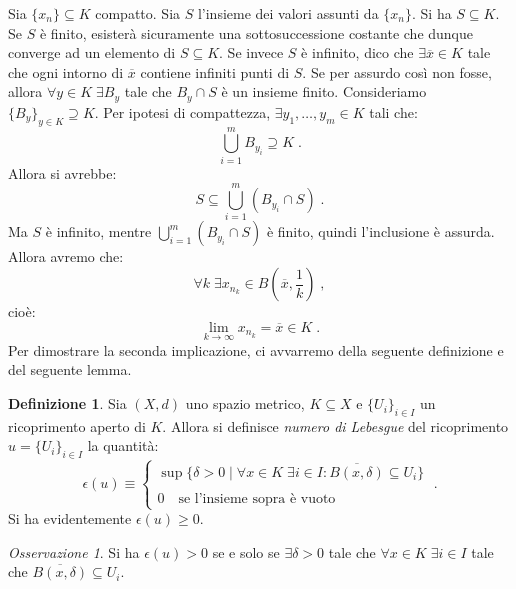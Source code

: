 \documentclass[a4paper,12pt]{report}
\theoremstyle{plain}
\theoremstyle{definition}
\newtheorem{defn}{Definizione}[section]
\theoremstyle{remark}
\newtheorem{oss}{Osservazione}[section]
\numberwithin{equation}{section}
\begin{document}
Sia $\{x_n\} \subseteq K$ compatto. Sia $S$ l'insieme dei valori assunti da $\{x_n\}$. Si ha $S \subseteq K$. Se $S$ è finito, esisterà 
sicuramente una sottosuccessione costante che dunque converge ad un elemento di $S \subseteq K$. Se invece $S$ è infinito, dico che 
$\exists \overline{x} \in K$ tale che ogni intorno di $\overline{x}$ contiene infiniti punti di $S$. Se per assurdo così non fosse, allora
 $\forall y \in K\; \exists B_y$ tale che $B_y \cap S$ è un insieme finito. Consideriamo $\{B_y\}_{y \in K} \supseteq K$. Per ipotesi di 
compattezza, $\exists y_1,\ldots,y_m \in K$ tali che:
\begin{equation}
\bigcup_{i=1}^m B_{y_i} \supseteq K\;.
\end{equation}
Allora si avrebbe:
\begin{equation}
S \subseteq \bigcup_{i=1}^m (B_{y_i} \cap S)\;.
\end{equation}
Ma $S$ è infinito, mentre $\bigcup_{i=1}^m (B_{y_i}\cap S)$ è finito, quindi l'inclusione è assurda. Allora avremo che:
\begin{equation}
\forall k\; \exists x_{n_k} \in B\left(\overline{x},\frac{1}{k}\right)\;,
\end{equation}
cioè:
\begin{equation}
\lim_{k \to \infty} x_{n_k}=\overline{x} \in K\;.
\end{equation}
\endproof
Per dimostrare la seconda implicazione, ci avvarremo della seguente definizione e del seguente lemma.
\begin{defn} Sia $(X,d)$ uno spazio metrico, $K\subseteq X$ e $\{U_i\}_{i \in I}$ un ricoprimento aperto di $K$. Allora si definisce \textit{numero di Lebesgue} del ricoprimento $u=\{U_i\}_{i \in I}$ la quantità:
\begin{equation}
\epsilon(u)\equiv \begin{cases}
              \sup\{\delta>0\;|\;\forall x \in K\;\exists i \in I:\overline{B(x,\delta)}\subseteq U_i\} \\
              \\
0\quad \mbox{se l'insieme sopra è vuoto}
             \end{cases}\;.
\end{equation}
Si ha evidentemente $\epsilon(u)\ge 0$.
\end{defn}
\begin{oss} Si ha $\epsilon(u)>0$ se e solo se $\exists \delta>0$ tale che $\forall x \in K\; \exists i \in I$ tale che $\overline{B(x,\delta)}
\subseteq U_i$.
\end{oss}
\end{document}
